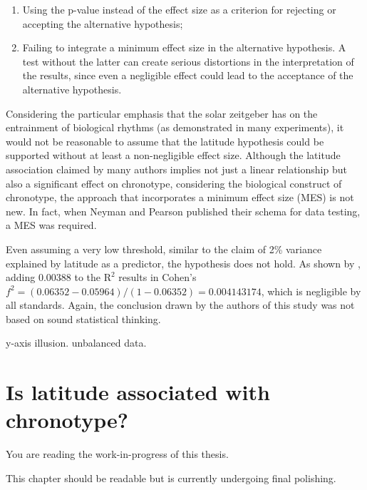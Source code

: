 \documentclass[
12pt,
openright,
oneside,
a4paper,
chapter=TITLE,
section=TITLE,
french,
spanish,
brazil,
english
]{abntex2}\usepackage{array}
\newcommand{\microskip}{\vspace{\microskipamount}}
\begin{document}
\begin{enumerate}
\def\labelenumi{\arabic{enumi}.}
\tightlist
\item
  Using the p-value instead of the effect size as a criterion for
  rejecting or accepting the alternative hypothesis;
\item
  Failing to integrate a minimum effect size in the alternative
  hypothesis. A test without the latter can create serious distortions
  in the interpretation of the results, since even a negligible effect
  could lead to the acceptance of the alternative hypothesis.
\end{enumerate}

Considering the particular emphasis that the solar zeitgeber has on the
entrainment of biological rhythms (as demonstrated in many experiments),
it would not be reasonable to assume that the latitude hypothesis could
be supported without at least a non-negligible effect size. Although the
latitude association claimed by many authors implies not just a linear
relationship but also a significant effect on chronotype, considering
the biological construct of chronotype, the approach that incorporates a
minimum effect size (MES) is not new. In fact, when Neyman and Pearson
published their schema for data testing, a MES was required.

Even assuming a very low threshold, similar to the claim of 2\% variance
explained by latitude as a predictor, the hypothesis does not hold. As
shown by \textcite{leocadio-miguel2017}, adding \(0.00388\) to the
\(\text{R}^2\) results in Cohen's
\(f^2 = (0.06352 - 0.05964) / (1 - 0.06352) = 0.004143174\), which is
negligible by all standards. Again, the conclusion drawn by the authors
of this study was not based on sound statistical thinking.

y-axis illusion. unbalanced data.


\chapter{Is latitude associated with
chronotype?}\label{is-latitude-associated-with-chronotype}

\begin{tcolorbox}[enhanced jigsaw, coltitle=black, opacitybacktitle=0.6, colframe=quarto-callout-note-color-frame, arc=.35mm, colbacktitle=quarto-callout-note-color!10!white, titlerule=0mm, title=\textcolor{quarto-callout-note-color}{\faInfo}\hspace{0.5em}{Note}, breakable, bottomrule=.15mm, rightrule=.15mm, bottomtitle=1mm, left=2mm, opacityback=0, toprule=.15mm, leftrule=.75mm, toptitle=1mm, colback=white]

You are reading the work-in-progress of this thesis.

\microskip

This chapter should be readable but is currently undergoing final
polishing.

\end{tcolorbox}
\end{document}
